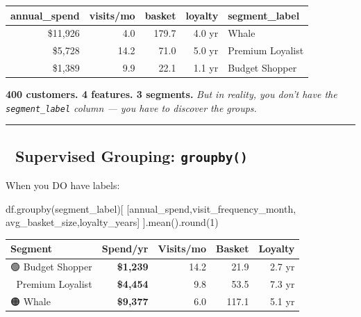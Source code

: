 \documentclass[
]{article}
\newenvironment{Shaded}{\begin{snugshade}}{\end{snugshade}}
\newcommand{\BuiltInTok}[1]{#1}
\newcommand{\DecValTok}[1]{\textcolor[rgb]{0.00,0.00,0.81}{#1}}
\newcommand{\NormalTok}[1]{#1}
\newcommand{\StringTok}[1]{\textcolor[rgb]{0.31,0.60,0.02}{#1}}
\begin{document}
\begin{longtable}[]{@{}rrrrl@{}}
\toprule\noalign{}
annual\_spend & visits/mo & basket & loyalty & segment\_label \\
\midrule\noalign{}
\endhead
\bottomrule\noalign{}
\endlastfoot
\$11,926 & 4.0 & 179.7 & 4.0 yr & Whale \\
\$5,728 & 14.2 & 71.0 & 5.0 yr & Premium Loyalist \\
\$1,389 & 9.9 & 22.1 & 1.1 yr & Budget Shopper \\
\end{longtable}

\textbf{400 customers. 4 features. 3 segments.} \emph{But in reality,
you don't have the \texttt{segment\_label} column --- you have to
discover the groups.}

\begin{center}\rule{0.5\linewidth}{0.5pt}\end{center}

\subsection{\texorpdfstring{🔬 Supervised Grouping:
\texttt{groupby()}}{🔬 Supervised Grouping: groupby()}}\label{supervised-grouping-groupby}

When you DO have labels:

\begin{Shaded}
\begin{Highlighting}[]
\NormalTok{df.groupby(}\StringTok{\textquotesingle{}segment\_label\textquotesingle{}}\NormalTok{)[}
\NormalTok{    [}\StringTok{\textquotesingle{}annual\_spend\textquotesingle{}}\NormalTok{,}\StringTok{\textquotesingle{}visit\_frequency\_month\textquotesingle{}}\NormalTok{,}
     \StringTok{\textquotesingle{}avg\_basket\_size\textquotesingle{}}\NormalTok{,}\StringTok{\textquotesingle{}loyalty\_years\textquotesingle{}}\NormalTok{]}
\NormalTok{].mean().}\BuiltInTok{round}\NormalTok{(}\DecValTok{1}\NormalTok{)}
\end{Highlighting}
\end{Shaded}

\begin{longtable}[]{@{}lrrrr@{}}
\toprule\noalign{}
Segment & Spend/yr & Visits/mo & Basket & Loyalty \\
\midrule\noalign{}
\endhead
\bottomrule\noalign{}
\endlastfoot
🟢 Budget Shopper & \textbf{\$1,239} & 14.2 & 21.9 & 2.7 yr \\
🔵 Premium Loyalist & \textbf{\$4,454} & 9.8 & 53.5 & 7.3 yr \\
🟠 Whale & \textbf{\$9,377} & 6.0 & 117.1 & 5.1 yr \\
\end{longtable}
\end{document}
